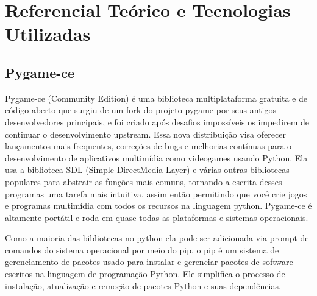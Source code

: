 \chapter{Referencial Teórico e Tecnologias Utilizadas}
\label{sec-referencial}



\section{Pygame-ce}

Pygame-ce (Community Edition) é uma biblioteca multiplataforma gratuita e de código aberto que surgiu de um fork do projeto pygame por seus antigos desenvolvedores principais, e foi criado após desafios impossíveis os impedirem de continuar o desenvolvimento upstream. Essa nova distribuição visa oferecer lançamentos mais frequentes, correções de bugs e melhorias contínuas para o desenvolvimento de aplicativos multimídia como videogames usando Python. Ela usa a biblioteca SDL (Simple DirectMedia Layer) e várias outras bibliotecas populares para abstrair as funções mais comuns, tornando a escrita desses programas uma tarefa mais intuitiva, assim então permitindo que você crie jogos e programas multimídia com todos os recursos na linguagem python. Pygame-ce é altamente portátil e roda em quase todas as plataformas e sistemas operacionais.\cite{Pygame-ce}

Como a maioria das bibliotecas no python ela pode ser adicionada via prompt de comandos do sistema operacional  por meio do pip, o pip é um sistema de gerenciamento de pacotes usado para instalar e gerenciar pacotes de software escritos na linguagem de programação Python. Ele simplifica o processo de instalação, atualização e remoção de pacotes Python e suas dependências. 

